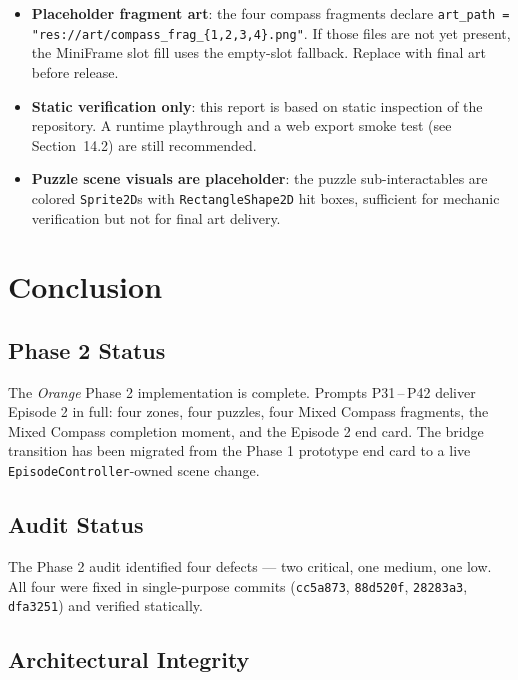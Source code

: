 \documentclass[12pt, a4paper]{article}
\begin{document}
\begin{itemize}
  \item \textbf{Placeholder fragment art}: the four compass fragments declare
        \texttt{art\_path = "res://art/compass\_frag\_\{1,2,3,4\}.png"}. If
        those files are not yet present, the MiniFrame slot fill uses the
        empty-slot fallback. Replace with final art before release.
  \item \textbf{Static verification only}: this report is based on static
        inspection of the repository. A runtime playthrough and a web export
        smoke test (see Section~14.2) are still recommended.
  \item \textbf{Puzzle scene visuals are placeholder}: the puzzle sub-interactables
        are colored \texttt{Sprite2D}s with \texttt{RectangleShape2D} hit boxes,
        sufficient for mechanic verification but not for final art delivery.
\end{itemize}

\section{Conclusion}

\subsection{Phase 2 Status}

The \textit{Orange} Phase 2 implementation is complete. Prompts P31\,--\,P42
deliver Episode 2 in full: four zones, four puzzles, four Mixed Compass
fragments, the Mixed Compass completion moment, and the Episode 2 end card.
The bridge transition has been migrated from the Phase 1 prototype end card
to a live \texttt{EpisodeController}-owned scene change.

\subsection{Audit Status}

The Phase 2 audit identified four defects --- two critical, one medium, one
low. All four were fixed in single-purpose commits
(\texttt{cc5a873}, \texttt{88d520f}, \texttt{28283a3}, \texttt{dfa3251})
and verified statically.

\subsection{Architectural Integrity}
\end{document}
